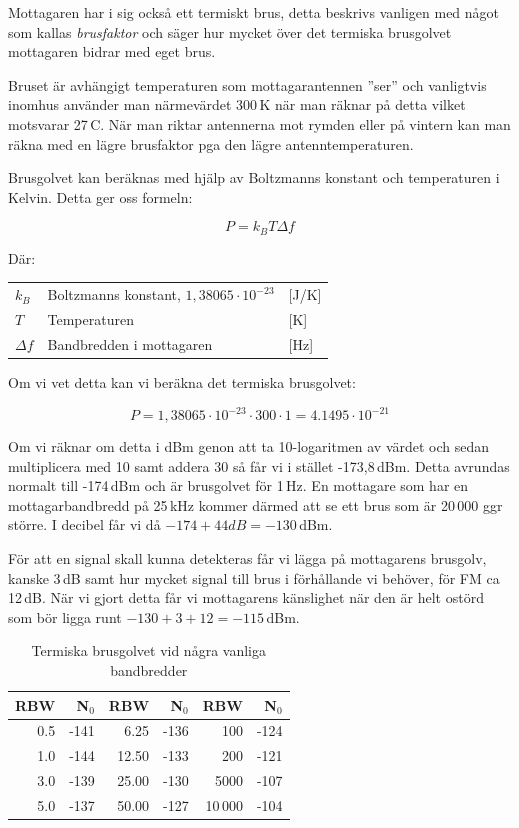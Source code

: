 Mottagaren har i sig också ett termiskt brus, detta beskrivs vanligen med
något som kallas \textit{brusfaktor} och säger hur mycket över det termiska
brusgolvet mottagaren bidrar med eget brus.

Bruset är avhängigt temperaturen som mottagarantennen ''ser'' och vanligtvis
inomhus använder man närmevärdet 300\,K när man räknar på detta vilket
motsvarar 27\,\textdegree C. När man riktar antennerna mot rymden eller på
vintern kan man räkna med en lägre brusfaktor pga den lägre
antenntemperaturen.

Brusgolvet kan beräknas med hjälp av Boltzmanns konstant och temperaturen i
Kelvin. Detta ger oss formeln:

\begin{equation}
	P=k_BT\Delta f
\end{equation}

Där:

\begin{tabular}{lll}
	$k_B$      & Boltzmanns konstant, $1,38065\cdot 10^{-23}$ & [J/K] \\
	$T$        & Temperaturen                                 & [K]   \\
	$\Delta f$ & Bandbredden i mottagaren                     & [Hz]
\end{tabular}

Om vi vet detta kan vi beräkna det termiska brusgolvet:

$$P = 1,38065\cdot 10^{-23} \cdot 300 \cdot 1 = 4.1495\cdot 10^{-21}$$

Om vi räknar om detta i dBm genon att ta 10-logaritmen av värdet och sedan
multiplicera med 10 samt addera 30 så får vi i stället -173,8\,dBm. Detta
avrundas normalt till -174\,dBm och är brusgolvet för 1\,Hz. En mottagare som
har en mottagarbandbredd på 25\,kHz kommer därmed att se ett brus som är
20\,000 ggr större. I decibel får vi då $-174 + 44 dB = -130$\,dBm.

För att en signal skall kunna detekteras får vi lägga på mottagarens brusgolv,
kanske 3\,dB samt hur mycket signal till brus i förhållande vi behöver, för FM
ca 12\,dB. När vi gjort detta får vi mottagarens känslighet när den är helt
ostörd som bör ligga runt $-130 + 3 + 12 = -115$\,dBm.

\begin{table}[H]
\centering
\begin{tabular}{rr|rr|rr}
	\textbf{RBW} & \textbf{N$_0$} & \textbf{RBW} & \textbf{N$_0$} & \textbf{RBW} & \textbf{N$_0$} \\ \hline
	         0.5 &           -141 &         6.25 &           -136 &          100 &           -124 \\
	         1.0 &           -144 &        12.50 &           -133 &          200 &           -121 \\
	         3.0 &           -139 &        25.00 &           -130 &         5000 &           -107 \\
	         5.0 &           -137 &        50.00 &           -127 &        10\,000 &           -104
\end{tabular}
\caption{Termiska brusgolvet vid några vanliga bandbredder}
\end{table}


